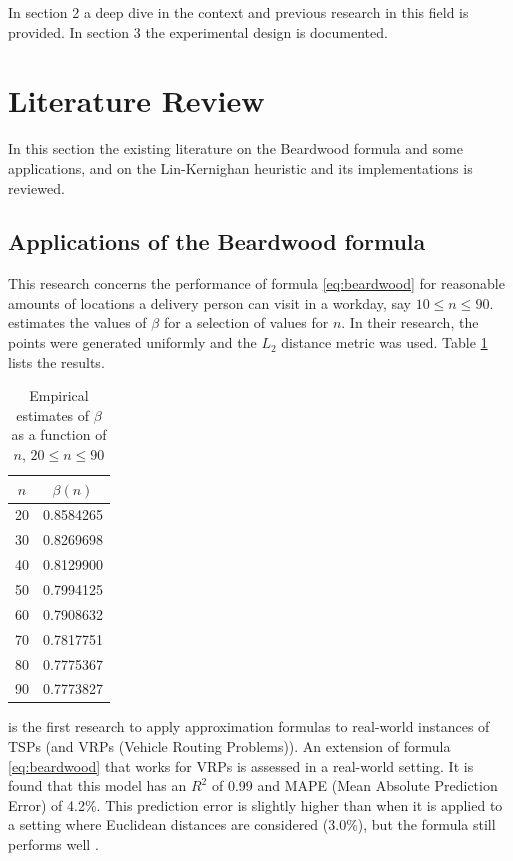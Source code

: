 \documentclass[12pt]{article}
\numberwithin{equation}{section}
\newcommand{\1}[1]{\,I_{#1}} %
\begin{document}
In section 2 a deep dive in the context and previous research in this field is provided.
In section 3 the experimental design is documented.
\section{Literature Review}
In this section the existing literature on the Beardwood formula and some applications,
and on the Lin-Kernighan heuristic and its implementations is reviewed.
\subsection{Applications of the Beardwood formula}
This research concerns the performance of formula \ref{eq:beardwood} for reasonable amounts of
locations a delivery person can visit in a workday, say $10\leq n\leq90$.
\citet{lei2015dynamic} estimates the values of $\beta$ for a selection of values for $n$.
In their research, the points were generated uniformly and the $L_2$ distance metric was used.
Table \ref{tab:beta-values} lists the results.
\begin{table}[H]
	\centering
	\caption{Empirical estimates of $\beta$ as a function of $n$, $20 \leq n \leq 90$\\
		\citep{lei2015dynamic}}
	\label{tab:beta-values}
	\begin{tabular}{cc}
		\toprule
		$n$ & $\beta(n)$ \\
		\midrule
		20  & 0.8584265  \\
		30  & 0.8269698  \\
		40  & 0.8129900  \\
		50  & 0.7994125  \\
		60  & 0.7908632  \\
		70  & 0.7817751  \\
		80  & 0.7775367  \\
		90  & 0.7773827  \\
		\bottomrule
	\end{tabular}
\end{table}
\citet{figliozzi2008planning} is the first research to apply approximation formulas to real-world
instances of TSPs (and VRPs (Vehicle Routing Problems)). An extension of formula
\ref{eq:beardwood} that works for VRPs is assessed in a real-world setting. It is found that this
model has an $R^2$ of 0.99 and MAPE (Mean Absolute Prediction Error) of 4.2\%. This prediction error
is slightly higher than when it is applied to a setting where Euclidean distances are considered (3.0\%),
but the formula still performs well \citep{figliozzi2008planning}.
\end{document}
